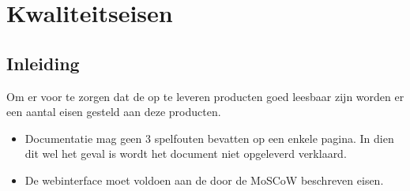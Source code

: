 \chapter{Kwaliteitseisen}
\section{Inleiding}
Om er voor te zorgen dat de op te leveren producten goed leesbaar zijn worden er een aantal eisen gesteld aan deze producten.

\begin{itemize}
	\item Documentatie mag geen 3 spelfouten bevatten op een enkele pagina. In dien dit wel het geval is wordt het document niet opgeleverd verklaard.
	\item De webinterface moet voldoen aan de door de MoSCoW beschreven eisen.
\end{itemize}
